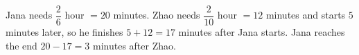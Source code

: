 Jana needs $\dfrac{2}{6}$ hour $=20$ minutes. Zhao needs $\dfrac{2}{10}$ hour $=12$ minutes and starts $5$ minutes later, so he finishes $5+12=17$ minutes after Jana starts. Jana reaches the end $20-17=\boxed{3}$ minutes after Zhao.
